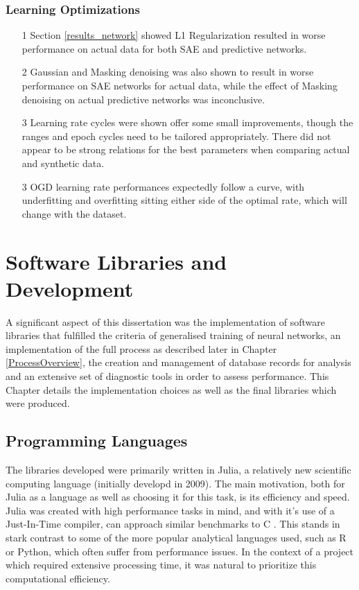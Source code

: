 \documentclass[a4paper,11pt,oneside]{article}
\theoremstyle{plain}
\theoremstyle{definition}
\begin{document}
	\subsubsection{Learning Optimizations}
	\begin{itemize}
		\item[1] Section \ref{results_network} showed L1 Regularization resulted in worse performance on actual data for both SAE and predictive networks.
		\item[2] Gaussian and Masking denoising was also shown to result in worse performance on SAE networks for actual data, while the effect of Masking denoising on actual predictive networks was inconclusive.
		\item[3] Learning rate cycles were shown offer some small improvements, though the ranges and epoch cycles need to be tailored appropriately. There did not appear to be strong relations for the best parameters when comparing actual and synthetic data.
		\item[3] OGD learning rate performances expectedly follow a curve, with underfitting and overfitting sitting either side of the optimal rate, which will change with the dataset.
	\end{itemize}
	
	
	
	
	
	
	
	\newpage
	\section{Software Libraries and Development}\label{Software}
	
	A significant aspect of this dissertation was the implementation of software libraries that fulfilled the criteria of generalised training of neural networks, an implementation of the full process as described later in Chapter \ref{ProcessOverview}, the creation and management of database records for analysis and an extensive set of diagnostic tools in order to assess performance. This Chapter details the implementation choices as well as the final libraries which were produced.
	
	
	\subsection{Programming Languages}
	
	The libraries developed were primarily written in Julia, a relatively new scientific computing language (initially developd in 2009). The main motivation, both for Julia as a language as well as choosing it for this task, is its efficiency and speed. Julia was created with high performance tasks in mind, and with it's use of a Just-In-Time compiler, can approach similar benchmarks to C \cite{Perkel}. This stands in stark contrast to some of the more popular analytical languages used, such as R or Python, which often suffer from performance issues. In the context of a project which required extensive processing time, it was natural to prioritize this computational efficiency. \newline
	
\end{document}
